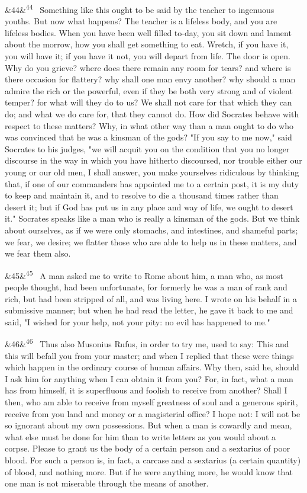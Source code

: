\documentclass[12pt]{article}
\newcommand{\para}[1][]{\par\noindent\ifx&#1&\else\textsuperscript{\footnotesize #1}~\fi}
\begin{document}
\para[44] Something like this ought to be said by the teacher to ingenuous youths. But now what happens? The teacher is a lifeless body, and you are lifeless bodies. When you have been well filled to-day, you sit down and lament about the morrow, how you shall get something to eat. Wretch, if you have it, you will have it; if you have it not, you will depart from life. The door is open. Why do you grieve? where does there remain any room for tears? and where is there occasion for flattery? why shall one man envy another? why should a man admire the rich or the powerful, even if they be both very strong and of violent temper? for what will they do to us? We shall not care for that which they can do; and what we do care for, that they cannot do. How did Socrates behave with respect to these matters? Why, in what other way than a man ought to do who was convinced that he was a kinsman of the gods? "If you say to me now," said Socrates to his judges, "we will acquit you on the condition that you no longer discourse in the way in which you have hitherto discoursed, nor trouble either our young or our old men, I shall answer, you make yourselves ridiculous by thinking that, if one of our commanders has appointed me to a certain post, it is my duty to keep and maintain it, and to resolve to die a thousand times rather than desert it; but if God has put us in any place and way of life, we ought to desert it." Socrates speaks like a man who is really a kinsman of the gods. But we think about ourselves, as if we were only stomachs, and intestines, and shameful parts; we fear, we desire; we flatter those who are able to help us in these matters, and we fear them also.

\para[45] A man asked me to write to Rome about him, a man who, as most people thought, had been unfortunate, for formerly he was a man of rank and rich, but had been stripped of all, and was living here. I wrote on his behalf in a submissive manner; but when he had read the letter, he gave it back to me and said, "I wished for your help, not your pity: no evil has happened to me."

\para[46] Thus also Musonius Rufus, in order to try me, used to say: This and this will befall you from your master; and when I replied that these were things which happen in the ordinary course of human affairs. Why then, said he, should I ask him for anything when I can obtain it from you? For, in fact, what a man has from himself, it is superfluous and foolish to receive from another? Shall I then, who am able to receive from myself greatness of soul and a generous spirit, receive from you land and money or a magisterial office? I hope not: I will not be so ignorant about my own possessions. But when a man is cowardly and mean, what else must be done for him than to write letters as you would about a corpse. Please to grant us the body of a certain person and a sextarius of poor blood. For such a person is, in fact, a carcase and a sextarius (a certain quantity) of blood, and nothing more. But if he were anything more, he would know that one man is not miserable through the means of another.
\end{document}
